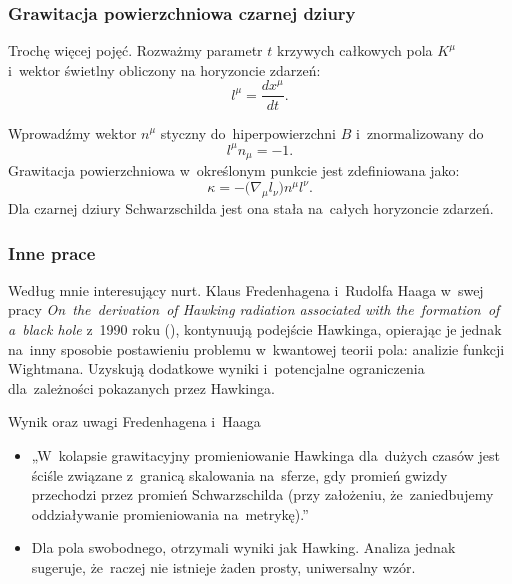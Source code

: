 \documentclass[10pt,t]{beamer}
\begin{document}
\begin{frame}
  \frametitle{Grawitacja powierzchniowa czarnej dziury}


  Trochę więcej pojęć.
  Rozważmy parametr $t$ krzywych całkowych pola $K^{ \mu }$ i~wektor
  świetlny obliczony na horyzoncie zdarzeń:
  \begin{equation}
    \label{eq:HawkingPromieniowanie-50}
    l^{ \mu } =  \frac{ d x^{ \mu } }{ d t }.
  \end{equation}

  Wprowadźmy wektor $n^{ \mu }$ styczny do~hiperpowierzchni $B$
  i~znormalizowany do
  \begin{equation}
    \label{eq:HawkingPromieniowanie-51}
    l^{ \mu } n_{ \mu } = -1.
  \end{equation}
  Grawitacja powierzchniowa w~określonym punkcie jest zdefiniowana
  jako:
  \begin{equation}
    \label{eq:HawkingPromieniowanie-52}
    \kappa = -\big( \nabla_{ \mu } l_{ \nu } \big) n^{ \mu } l^{ \nu }.
  \end{equation}
  Dla czarnej dziury Schwarzschilda jest ona stała na~całych
  horyzoncie zdarzeń.

\end{frame}





\begin{frame}
  \frametitle{Inne prace}


  Według mnie interesujący nurt. Klaus Fredenhagena i~Rudolfa Haaga w~swej
  pracy \textit{On~the~derivation~of Hawking radiation associated with
    the~formation~of a~black hole} z~1990 roku
  (\cite{FredenhagenHaagDerivationOfHawkingRadiation1990}),
  kontynuują podejście Hawkinga, opierając je jednak na~inny
  sposobie postawieniu problemu w~kwantowej teorii pola: analizie
  funkcji Wightmana. Uzyskują dodatkowe wyniki i~potencjalne
  ograniczenia dla~zależności pokazanych przez Hawkinga.

  Wynik oraz uwagi Fredenhagena i~Haaga
  \begin{itemize}
    \RaggedRight

  \item „W~kolapsie grawitacyjny promieniowanie Hawkinga dla~dużych
    czasów jest ściśle związane z~granicą skalowania na~sferze, gdy
    promień gwizdy przechodzi przez promień Schwarzschilda (przy
    założeniu, że~zaniedbujemy oddziaływanie promieniowania
    na~metrykę).”

  \item Dla pola swobodnego, otrzymali wyniki jak Hawking. Analiza
    jednak sugeruje, że~raczej nie istnieje żaden prosty,
    uniwersalny wzór.

  \end{itemize}

\end{frame}
\end{document}
